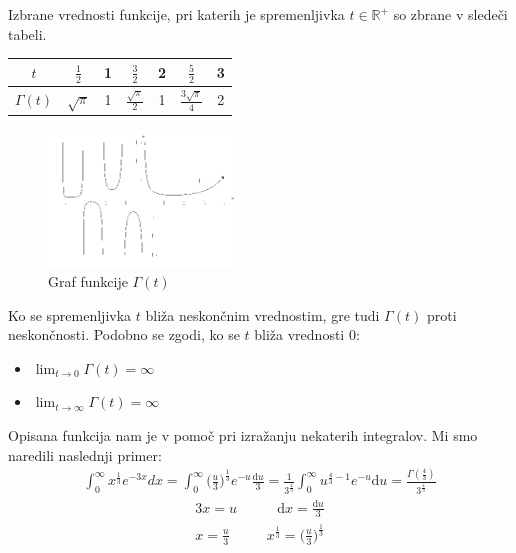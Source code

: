 \documentclass[12pt, a4paper]{article}
\begin{document}
Izbrane vrednosti funkcije, pri katerih je spremenljivka $t \in \mathbb{R^{+}}$ so zbrane v sledeči tabeli. 

\begin{center}
\begin{tabular}{| c || c | c | c | c | c | c |}
\hline
$t$ & $\frac{1}{2}$ & 1 & $\frac{3}{2}$ & 2 & $\frac{5}{2}$ & 3 \\
\hline
$\Gamma (t)$ & $\sqrt{\pi}$ & 1 & $\frac{\sqrt{\pi}}{2}$ & 1 & $\frac{3 \sqrt{\pi}}{4}$ & 2 \\
\hline
\end{tabular}
\end{center}

\begin{figure}[h!]
\centering
\includegraphics[width=0.45\textwidth]{graf}
\caption{Graf funkcije $ \Gamma (t) $}
\label{slika:gama}
\end{figure}


Ko se spremenljivka $t$ bliža neskončnim vrednostim, gre tudi $ \Gamma (t)$ proti neskončnosti. Podobno se zgodi, ko se $t$ bliža vrednosti 0:
\begin{itemize}
\item $ \lim_{t \to 0} \Gamma (t)= \infty $
\item $ \lim_{t \to \infty} \Gamma (t)= \infty $
\end{itemize}

Opisana funkcija nam je v pomoč pri izražanju nekaterih integralov. Mi smo naredili naslednji primer:
\begin{eqnarray*}
\int^{\infty}_{0} x^{\frac{1}{3}} e^{-3x}dx = \int^{\infty}_{0} \Big( \frac{u}{3} \Big)^{\frac{1}{3}} e^{-u}\frac{\mathrm{d} u}{3} = \frac{1}{3^{\frac{4}{3}}} \int^{\infty}_{0} u^{\frac{4}{3} -1} e^{-u} \mathrm{d} u = \frac{\Gamma (\frac{4}{3})}{3^{\frac{4}{3}}} 
\end{eqnarray*}
\begin{eqnarray*} 
3x = u ~~~~~~~~~~~~~ \mathrm{d}x = \frac{\mathrm{d}u}{3} \\
x = \frac{u}{3} ~~~~~~~~~~~~ x^{\frac{1}{3}} = \bigg( \frac{u}{3} \bigg)^{\frac{1}{3}} \\
\end{eqnarray*}










\end{document}
